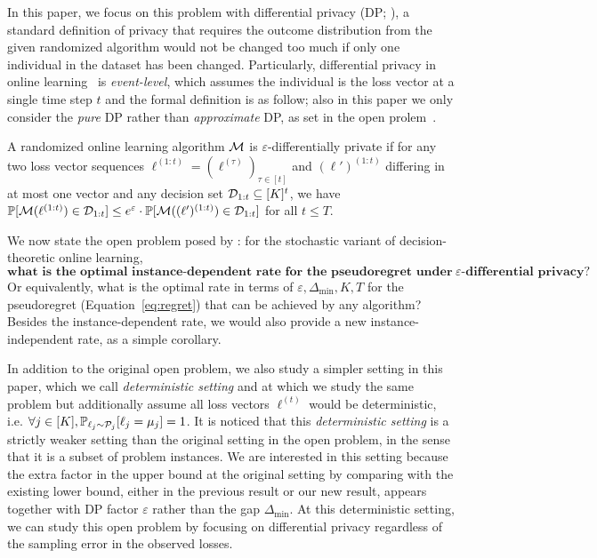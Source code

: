 In this paper, we focus on this problem with differential privacy (DP; \citet{dwork2014algorithmic}), a standard definition of privacy that requires the outcome distribution from the given randomized algorithm would not be changed too much if only one individual in the dataset has been changed.
Particularly, differential privacy in online learning~\citep{dwork2010differential} is \textit{event-level},  which assumes the individual is the loss vector at a single time step $t$ and the formal definition is as follow; also in this paper we only consider the \emph{pure} DP rather than \textit{approximate} DP, as set in the open prolem~\citep{hu2024open}.

\begin{definition}
	A randomized online learning algorithm $\mathcal{M}$ is $\varepsilon$-differentially private if for any two loss vector sequences $\ell^{(1:t)}=(\ell^{(\tau)})_{\tau \in[t]}$ and $(\ell')^{(1:t)}$ differing in at most one vector and any decision set $\mathcal{D}_{1:t}\subseteq [K]^t$, we have $\mathbb{P}[\mathcal{M}(\ell^{(1:t)})\in\mathcal{D}_{1:t}]\leq e^{\varepsilon}\cdot\mathbb{P}[\mathcal{M}((\ell')^{(1:t)})\in\mathcal{D}_{1:t}]$ for all $t\leq T$.
\end{definition}

We now state the open problem posed by \citet{hu2024open}: for the stochastic variant of decision-theoretic online learning,
$$\textbf{what is the optimal instance-dependent rate for the pseudoregret under $\varepsilon$-differential privacy?}$$
Or equivalently, what is the optimal rate in terms of $\varepsilon, \Delta_{\min}, K, T$ for the pseudoregret (Equation~\ref{eq:regret}) that can be achieved by any algorithm?
Besides the instance-dependent rate, we would also provide a new instance-independent rate, as a simple corollary.

In addition to the original open problem, we also study a simpler setting in this paper, which we call \textit{deterministic setting} and at which we study the same problem but additionally assume all loss vectors $\ell^{(t)}$ would be deterministic, i.e. $\forall j\in[K], \mathbb{P}_{\ell_j\sim \mathcal{P}_j}[\ell_j=\mu_j] = 1$.
It is noticed that this \textit{deterministic setting} is a strictly weaker setting than the original setting in the open problem, in the sense that it is a subset of problem instances.
We are interested in this setting because the extra factor in the upper bound at the original setting by comparing with the existing lower bound, either in the previous result or our new result, appears together with DP factor $\varepsilon$ rather than the gap $\Delta_{\min}$.
At this deterministic setting, we can study this open problem by focusing on differential privacy regardless of the sampling error in the observed losses.


